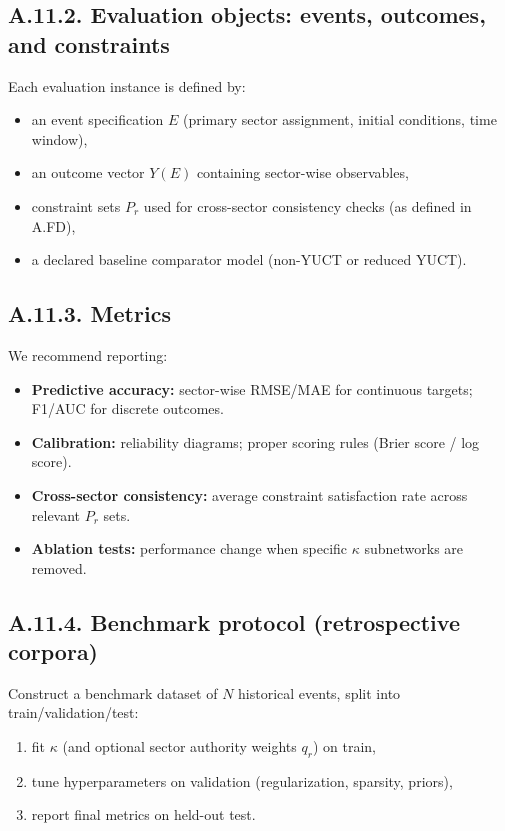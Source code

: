 \documentclass[13pt,a4paper]{article}
\begin{document}
	\subsection*{A.11.2. Evaluation objects: events, outcomes, and constraints}
	Each evaluation instance is defined by:
	\begin{itemize}[leftmargin=*]
		\item an event specification $E$ (primary sector assignment, initial conditions, time window),
		\item an outcome vector $Y(E)$ containing sector-wise observables,
		\item constraint sets $P_r$ used for cross-sector consistency checks (as defined in A.FD),
		\item a declared baseline comparator model (non-YUCT or reduced YUCT).
	\end{itemize}
	
	\subsection*{A.11.3. Metrics}
	We recommend reporting:
	\begin{itemize}[leftmargin=*]
		\item \textbf{Predictive accuracy:} sector-wise RMSE/MAE for continuous targets; F1/AUC for discrete outcomes.
		\item \textbf{Calibration:} reliability diagrams; proper scoring rules (Brier score / log score).
		\item \textbf{Cross-sector consistency:} average constraint satisfaction rate across relevant $P_r$ sets.
		\item \textbf{Ablation tests:} performance change when specific $\kappa$ subnetworks are removed.
	\end{itemize}
	
	\subsection*{A.11.4. Benchmark protocol (retrospective corpora)}
	Construct a benchmark dataset of $N$ historical events, split into train/validation/test:
	\begin{enumerate}[leftmargin=*]
		\item fit $\kappa$ (and optional sector authority weights $q_r$) on train,
		\item tune hyperparameters on validation (regularization, sparsity, priors),
		\item report final metrics on held-out test.
	\end{enumerate}
	
\end{document}

